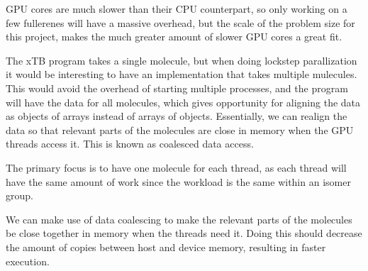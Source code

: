 GPU cores are much slower than their CPU counterpart, so only working on a few fullerenes will have a massive overhead, but the scale of the problem size for this project, makes the much greater amount of slower GPU cores a great fit.

The xTB program takes a single molecule, but when doing lockstep parallization it would be interesting to have an implementation that takes multiple mulecules. This would avoid the overhead of starting multiple processes, and the program will have the data for all molecules, which gives opportunity for aligning the data as objects of arrays instead of arrays of objects. Essentially, we can realign the data so that relevant parts of the molecules are close in memory when the GPU threads access it. This is known as coalesced data access.

The primary focus is to have one molecule for each thread, as each thread will have the same amount of work since the workload is the same within an isomer group.

We can make use of data coalescing to make the relevant parts of the molecules be close together in memory when the threads need it. Doing this should decrease the amount of copies between host and device memory, resulting in faster execution.

